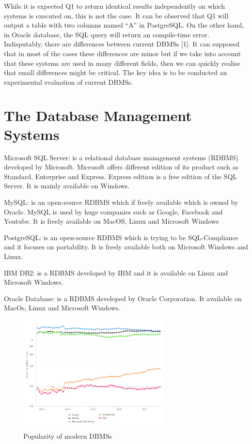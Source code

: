 While it is expected Q1 to return identical results independently on which systems is executed on, this is not the case. It can be observed that Q1 will output a table with two columns named “A” in PostgreSQL. On the other hand, in Oracle database, the SQL query will return an compile-time error. Ιndisputably, there are differences between current DBMSs [1]. 
It can supposed that in most of the cases these differences are minor but if we take into account that these systems are used in many different fields, then we can quickly realise that small differences might be critical. The key idea is to be conducted an experimental evaluation of current DBMSs. 


\section{The Database Management Systems} 

Microsoft SQL Server: is a relational database management systems (RDBMS) developed by Microsoft. Microsoft offers different edition of its product such as Standard, Enterprise and Express. Express edition is a free edition of the SQL Server. It is mainly available on Windows. 

MySQL: is an open-source RDBMS which if freely available which is owned by Oracle. MySQL is used by huge companies such as Google, Facebook and Youtube. It is freely available on MacOS, Linux and Microsoft Windows 

PostgreSQL: is an open-source RDBMS which is trying to be SQL-Compliance and it focuses on portability.  It is freely available both on Microsoft Windows and Linux. 

IBM DB2: is a RDBMS developed by IBM and it is available on Linux and Microsoft Windows. 

Oracle Database: is a RDBMS developed by Oracle Corporation.  It available on MacOs, Linux and Microsoft Windows. 


 \begin{figure} 
      \centering
      \includegraphics[width=\textwidth,height=6cm]{Images/db_engines_chart}
      \caption{Popularity of modern DBMSs}
      \label{fig: Popularity of modern DBMSs}
    \end{figure}

